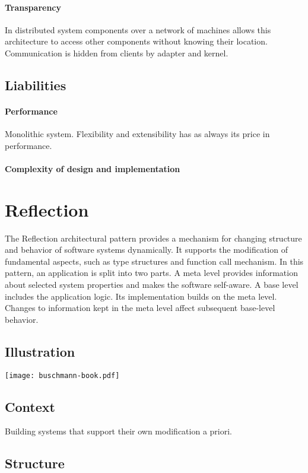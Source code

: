 \documentclass[a4paper,11pt,twocolumn]{report}
\begin{document}
    \paragraph{Transparency} In distributed system components over a network of
    machines allows this architecture to access other components without
    knowing their location. Communication is hidden from clients by adapter and
    kernel.
    \subsection{Liabilities}
    \paragraph{Performance} Monolithic system. Flexibility and extensibility
    has as always its price in performance.
    \paragraph{Complexity of design and implementation} 


    \section{Reflection}
    The Reflection architectural pattern provides a mechanism for changing
    structure and behavior of software systems dynamically. It supports the
    modification of fundamental aspects, such as type structures and function
    call mechanism. In this pattern, an application is split into two parts.
    A meta level provides information about selected system properties and makes
    the software self-aware. A base level includes the application logic. Its
    implementation builds on the meta level. Changes to information kept in the
    meta level affect subsequent base-level behavior.
    \subsection{Illustration}
    \texttt{[image: buschmann-book.pdf]}
    \subsection{Context}
    Building systems that support their own modification a priori.
    \subsection{Structure}
\end{document}
